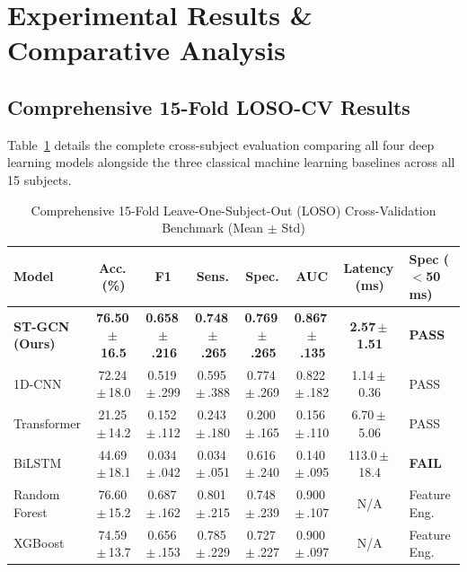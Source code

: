 \documentclass[conference]{IEEEtran}
\begin{document}
\section{Experimental Results \& Comparative Analysis}

\subsection{Comprehensive 15-Fold LOSO-CV Results}
Table~\ref{tab:loso_results} details the complete cross-subject evaluation comparing all four deep learning models alongside the three classical machine learning baselines across all 15 subjects.

\begin{table}[htbp]
\caption{Comprehensive 15-Fold Leave-One-Subject-Out (LOSO) Cross-Validation Benchmark (Mean $\pm$ Std)}
\label{tab:loso_results}
\centering
\small
\begin{tabularx}{\textwidth}{@{}lccccccX@{}}
\toprule
\textbf{Model} & \textbf{Acc.\,(\%)} & \textbf{F1} & \textbf{Sens.} & \textbf{Spec.} & \textbf{AUC} & \textbf{Latency\,(ms)} & \textbf{Spec ($<$50\,ms)} \\
\midrule
\textbf{ST-GCN (Ours)} & \textbf{76.50\,$\pm$\,16.5} & \textbf{0.658\,$\pm$\,.216} & \textbf{0.748\,$\pm$\,.265} & \textbf{0.769\,$\pm$\,.265} & \textbf{0.867\,$\pm$\,.135} & \textbf{2.57\,$\pm$\,1.51} & \textbf{PASS} \\
1D-CNN & 72.24\,$\pm$\,18.0 & 0.519\,$\pm$\,.299 & 0.595\,$\pm$\,.388 & 0.774\,$\pm$\,.269 & 0.822\,$\pm$\,.182 & 1.14\,$\pm$\,0.36 & PASS \\
Transformer & 21.25\,$\pm$\,14.2 & 0.152\,$\pm$\,.112 & 0.243\,$\pm$\,.180 & 0.200\,$\pm$\,.165 & 0.156\,$\pm$\,.110 & 6.70\,$\pm$\,5.06 & PASS \\
BiLSTM & 44.69\,$\pm$\,18.1 & 0.034\,$\pm$\,.042 & 0.034\,$\pm$\,.051 & 0.616\,$\pm$\,.240 & 0.140\,$\pm$\,.095 & 113.0\,$\pm$\,18.4 & \textbf{FAIL} \\
\midrule
Random Forest & 76.60\,$\pm$\,15.2 & 0.687\,$\pm$\,.162 & 0.801\,$\pm$\,.215 & 0.748\,$\pm$\,.239 & 0.900\,$\pm$\,.107 & N/A & Feature Eng. \\
XGBoost & 74.59\,$\pm$\,13.7 & 0.656\,$\pm$\,.153 & 0.785\,$\pm$\,.229 & 0.727\,$\pm$\,.227 & 0.900\,$\pm$\,.097 & N/A & Feature Eng. \\
\bottomrule
\end{tabularx}
\end{table}
\end{document}
